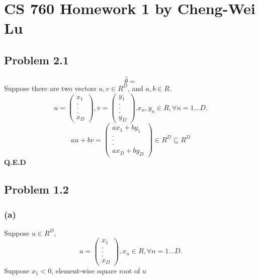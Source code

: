 \documentclass{article}
\begin{document}
 

\section*{CS 760 Homework 1 by Cheng-Wei Lu}

\subsection*{Problem 2.1}
	\begin{equation*}
		\hat{\theta} = 
	\end{equation*}
	Suppose there are two vectors $u,v \in R^D$, and $a,b \in R$.
	\begin{equation*}
		u= \begin{pmatrix} x_1 \\ . \\ . \\ . \\ x_D \end{pmatrix},  v= \begin{pmatrix} y_1 \\ . \\ . \\ . \\ y_D \end{pmatrix}.     x_n, y_n \in R, \forall n = 1 ... D. 
	\end{equation*}
	\begin{equation*}
		au + bv =  \begin{pmatrix} ax_1 + by_1\\ . \\ . \\ . \\ ax_D+by_D \end{pmatrix} \in R^D \subseteq R^D 
	\end{equation*}
	\textbf{Q.E.D}

\subsection*{Problem 1.2}
    \subsubsection*{(a)}	
    	Suppose $u \in R^D$,
    	 \begin{equation*}
    		u= \begin{pmatrix} x_1 \\ . \\ . \\ . \\ x_D \end{pmatrix}, x_n \in R, \forall n = 1 ... D. 
    	\end{equation*}
    	Suppose $x_1 <  0$, element-wise square root of $u$
    	
\end{document}
